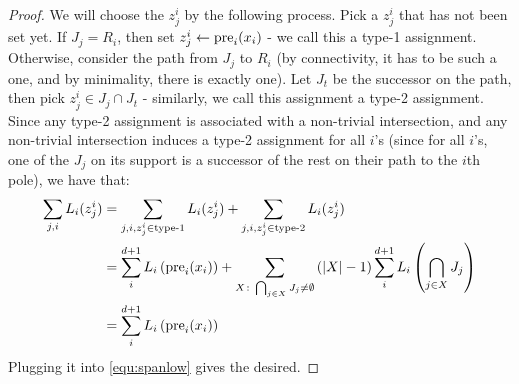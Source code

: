 \begin{proof}
We will choose the $z_{j}^{i}$ by the following process. Pick a $z_{j}^{i}$ that has not been set yet. If $J_{j} = R_{i}$, then set $z_{j}^{i} \leftarrow \text{pre}_{i}(x_{i})$ - we call this a type-1 assignment. Otherwise, consider the path from $J_{j}$ to $R_{i}$ (by connectivity, it has to be such a one, and by minimality, there is exactly one). Let $J_{t}$ be the successor on the path, then pick $z_{j}^{i} \in J_{j} \cap J_{t}$ - similarly, we call this assignment a type-2 assignment. Since any type-2 assignment is associated with a non-trivial intersection, and any non-trivial intersection induces a type-2 assignment for all $i$'s (since for all $i$'s, one of the $J_{j}$ on its support is a successor of the rest on their path to the $i$th pole), we have that:
    \begin{equation*}
      \begin{split}
        \sum_{j,i}L_{i}(z_{j}^{i}) &= \sum_{j,i, z_{j}^{i} \in \text{type-1}}L_{i}(z_{j}^{i}) + \sum_{j,i, z_{j}^{i} \in \text{type-2}}L_{i}(z_{j}^{i}) \\
        &= \sum_{i}^{d+1}L_{i}\left( \text{pre}_{i}(x_{i}) \right) + \sum_{X \colon \bigcap_{j\in X}J_{j} \neq \emptyset }\left(|X|-1\right) \sum_{i}^{d+1} L_{i}\left(\bigcap_{j\in X}J_{j} \right) \\ 
        &=\sum_{i}^{d+1}L_{i}\left( \text{pre}_{i}(x_{i}) \right) 
      \end{split}
    \end{equation*}
    Plugging it into \cref{equ:spanlow} gives the desired.
  \end{proof}

